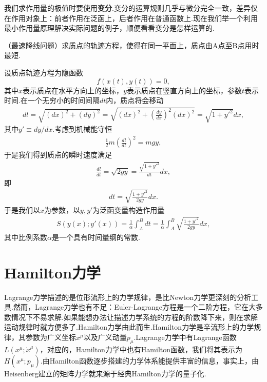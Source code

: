 		我们求作用量的极值时要使用\textbf{变分}.变分的运算规则几乎与微分完全一致，差异仅在作用对象上：前者作用在泛函上，后者作用在普通函数上.现在我们举一个利用最小作用量原理解决实际问题的例子，顺便看看变分是怎样运算的.
		\begin{example}
			（最速降线问题）求质点的轨迹方程，使得在同一平面上，质点由A点至B点用时最短.
			
			设质点轨迹方程为隐函数$$f(x(t),y(t))=0,$$其中$x$表示质点在水平方向上的坐标，$y$表示质点在竖直方向上的坐标，参数$t$表示时间.在一个无穷小的时间间隔$dt$内，质点将会移动
			\begin{eqnarray*}
				dl=\sqrt{(dx)^2+(dy)^2}=\sqrt{(dx)^2+\left(\frac{dy}{dx}\right)^2(dx)^2}=\sqrt{1+y'^2}dx,
			\end{eqnarray*}
			其中$y'\equiv dy/dx$.考虑到机械能守恒
			\begin{eqnarray*}
				\frac{1}{2}m\left(\frac{dl}{dt}\right)^2=mgy,
			\end{eqnarray*}
			于是我们得到质点的瞬时速度满足
			\begin{eqnarray*}
				\frac{dl}{dt}=\sqrt{2gy}=\frac{\sqrt{1+y'^2}}{dt}dx,
			\end{eqnarray*}
			即
			\begin{eqnarray*}
				dt=\sqrt{\frac{1+y'^2}{2gy}}dx.
			\end{eqnarray*}
			于是我们以$x$为参数，以$y,y'$为泛函变量构造作用量
			\begin{eqnarray*}
				S(y(x);y'(x))=\frac{1}{\alpha}\int^B_Adt=\frac{1}{\alpha}\int^B_A\sqrt{\frac{1+y'^2}{2gy}}dx,
			\end{eqnarray*}
			其中比例系数$\alpha$是一个具有时间量纲的常数.
		\end{example}
		
		

	\section{Hamilton力学}\label{sec:Hamilton}
		Lagrange力学描述的是位形流形上的力学规律，是比Newton力学更深刻的分析工具.然而，Lagrange力学也有不足：Euler-Lagrange方程是一个二阶方程，它在大多数情况下不易求解.如果能想办法让描述力学系统的方程的阶数降下来，则在求解运动规律时就方便多了.Hamilton力学由此而生.Hamilton力学是辛流形上的力学规律，其参数为广义坐标$x^\mu$以及广义动量$p_\mu$.Lagrange力学中有Lagrange函数$L(x^\mu;{\dot{x}}^\mu)$，对应的，Hamilton力学中也有Hamilton函数，我们将其表示为$H(x^\mu;p_\mu)$.由Hamilton函数逐步搭建的力学体系能提供丰富的信息，事实上，由Heisenberg建立的矩阵力学就来源于经典Hamilton力学的量子化.
